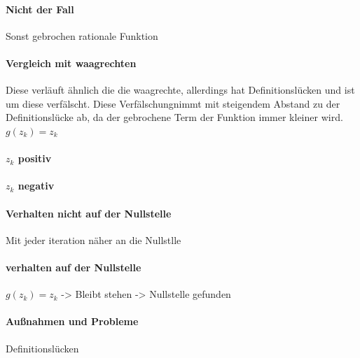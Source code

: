 \documentclass{article}
\begin{document}
\paragraph{Nicht der Fall}
Sonst gebrochen rationale Funktion
\paragraph{Vergleich mit waagrechten}
Diese verläuft ähnlich die die waagrechte, allerdings hat Definitionslücken und ist um diese \glqq verfälscht\grqq. Diese \glqq Verfälschung\grqq\space nimmt mit steigendem Abstand zu der Definitionslücke ab, da der gebrochene Term der Funktion immer kleiner wird. 
$g(z_k) = z_k$
\paragraph{$z_k$ positiv}

\paragraph{$z_k$ negativ}
\paragraph{Verhalten nicht auf der Nullstelle}
Mit jeder iteration näher an die Nullstlle
\paragraph{verhalten auf der Nullstelle}
$g(z_k) = z_k$ -> Bleibt stehen -> Nullstelle gefunden
\paragraph{Außnahmen und Probleme}
Definitionslücken
\end{document}
